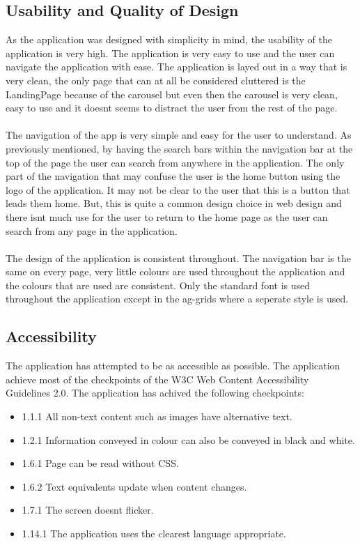 \documentclass[12pt,a4paper]{article}
\begin{document}
		\subsection{Usability and Quality of Design}
			As the application was designed with simplicity in mind, the usability of the application is 
			very high. The application is very easy to use and the user can navigate the application with 
			ease. The application is layed out in a way that is very clean, the only page that can at all be 
			considered cluttered is the LandingPage because of the carousel but even then the carousel is 
			very clean, easy to use and it doesnt seems to distract the user from the rest of the page.\\
			\\
			The navigation of the app is very simple and easy for the user to understand. As previously mentioned, 
			by having the search bars within  the navigation bar at the top of the page the user can search from 
			anywhere in the application. The only part of the navigation that may confuse the user is the home button 
			using the logo of the application. It may not be clear to the user that this is a button that leads them 
			home. But, this is quite a common design choice in web design and there isnt much use for the user to return 
			to the home page as the user can search from any page in the application.\\
			\\
			The design of the application is consistent throughout. The navigation bar is the same on every page, 
			very little colours are used throughout the application and the colours that are used are consistent.
			Only the standard font is used throughout the application except in the ag-grids where a seperate style 
			is used.\\
		
		\subsection{Accessibility}
			The application has attempted to be as accessible as possible. The application achieve most of the 
			checkpoints of the W3C Web Content Accessibility Guidelines 2.0. The application has achived the 
			following checkpoints:
			\begin{itemize}
				\item 1.1.1 All non-text content such as images have alternative text.
				\item 1.2.1 Information conveyed in colour can also be conveyed in black and white. 
				\item 1.6.1 Page can be read without CSS.
				\item 1.6.2 Text equivalents update when content changes.
				\item 1.7.1 The screen doesnt flicker.
				\item 1.14.1 The application uses the clearest language appropriate.
			\end{itemize}
		
\end{document}
